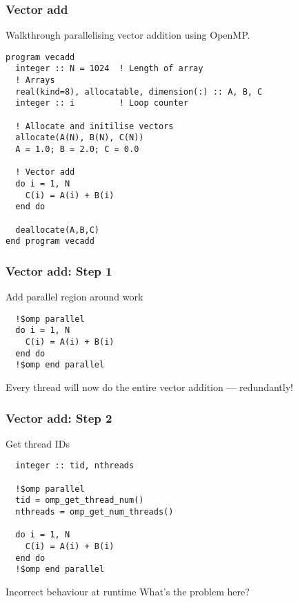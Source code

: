 \documentclass{beamer}
\begin{document}
\begin{frame}[fragile]
\frametitle{Vector add}
Walkthrough parallelising vector addition using OpenMP.

\begin{verbatim}
program vecadd
  integer :: N = 1024  ! Length of array
  ! Arrays
  real(kind=8), allocatable, dimension(:) :: A, B, C
  integer :: i         ! Loop counter

  ! Allocate and initilise vectors
  allocate(A(N), B(N), C(N))
  A = 1.0; B = 2.0; C = 0.0

  ! Vector add
  do i = 1, N
    C(i) = A(i) + B(i)
  end do

  deallocate(A,B,C)
end program vecadd
\end{verbatim}
\end{frame}

\begin{frame}[fragile]
\frametitle{Vector add: Step 1}
Add parallel region around work
\begin{verbatim}
  !$omp parallel
  do i = 1, N
    C(i) = A(i) + B(i)
  end do
  !$omp end parallel
\end{verbatim}
Every thread will now do the entire vector addition --- redundantly!
\end{frame}

\begin{frame}[fragile]
\frametitle{Vector add: Step 2}
Get thread IDs
\begin{verbatim}
  integer :: tid, nthreads

  !$omp parallel
  tid = omp_get_thread_num()
  nthreads = omp_get_num_threads()

  do i = 1, N
    C(i) = A(i) + B(i)
  end do
  !$omp end parallel
\end{verbatim}

\pause
\begin{alertblock}{Incorrect behaviour at runtime}
What's the problem here?
\end{alertblock}
\end{frame}
\end{document}
